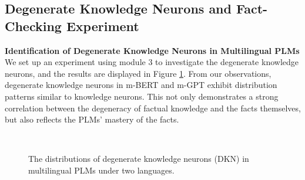 \documentclass[]{article}
\newcommand{\vpara}[1]{\vspace{0.05in}\noindent\textbf{#1 }}
\begin{document}
\subsection{Degenerate Knowledge Neurons and Fact-Checking Experiment}
\vpara{Identification of Degenerate Knowledge Neurons in Multilingual PLMs} 
We set up an experiment using module 3 to investigate the degenerate knowledge neurons, and the results are displayed in Figure \ref{fig:d}. From our observations, degenerate knowledge neurons in m-BERT and m-GPT exhibit distribution patterns similar to knowledge neurons. This not only demonstrates a strong correlation between the degeneracy of factual knowledge and the facts themselves, but also reflects the PLMs' mastery of the facts.

\begin{figure}[h]
  \centering
  \\
  \caption{The distributions of degenerate knowledge neurons (DKN) in multilingual PLMs under two languages.}
  \label{fig:d}
\end{figure}
\end{document}

